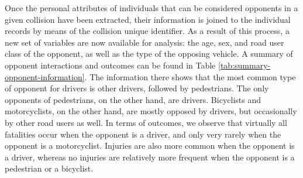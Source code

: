 \documentclass[]{elsarticle} %
\begin{document}
Once the personal attributes of individuals that can be considered
opponents in a given collision have been extracted, their information is
joined to the individual records by means of the collision unique
identifier. As a result of this process, a new set of variables are now
available for analysis: the age, sex, and road user class of the
opponent, as well as the type of the opposing vehicle. A summary of
opponent interactions and outcomes can be found in Table
\ref{tab:summary-opponent-information}. The information there shows that
the most common type of opponent for drivers is other drivers, followed
by pedestrians. The only opponents of pedestrians, on the other hand,
are drivers. Bicyclists and motorcyclists, on the other hand, are mostly
opposed by drivers, but occasionally by other road users as well. In
terms of outcomes, we observe that virtually all fatalities occur when
the opponent is a driver, and only very rarely when the opponent is a
motorcyclist. Injuries are also more common when the opponent is a
driver, whereas no injuries are relatively more frequent when the
opponent is a pedestrian or a bicyclist.
\end{document}
